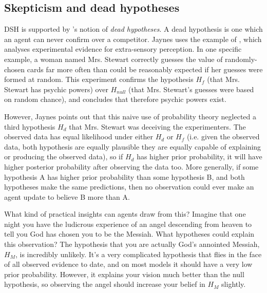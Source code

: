 \documentclass{article}
\begin{document}
\subsection{Skepticism and dead hypotheses}

DSH is supported by \citep{jaynes2003probability}'s notion of \textit{dead hypotheses}. A dead hypothesis is one which an agent can never confirm over a competitor. Jaynes uses the example of \citep{soal1954modern}, which analyses experimental evidence for extra-sensory perception. In one specific example, a woman named Mrs. Stewart correctly guesses the value of randomly-chosen cards far more often than could be reasonably expected if her guesses were formed at random. This experiment confirms the hypothesis \(H_{f}\) (that Mrs. Stewart has psychic powers) over \(H_{null}\) (that Mrs. Stewart's guesses were based on random chance), and concludes that therefore psychic powers exist. 

However, Jaynes points out that this naive use of probability theory neglected a third hypothesis \(H_{d}\) \textemdash{} that Mrs. Stewart was deceiving the experimenters. The observed data has equal likelihood under either \(H_{d}\) or \(H_{f}\) (i.e. given the observed data, both hypothesis are equally plausible \textemdash{} they are equally capable of explaining or producing the observed data), so if \(H_{d}\) has higher prior probability, it will have higher posterior probability after observing the data too. More generally, if some hypothesis A has higher prior probability than some hypothesis B, and both hypotheses make the same predictions, then no observation could ever make an agent update to believe B more than A. 

What kind of practical insights can agents draw from this? Imagine that one night you have the ludicrous experience of an angel descending from heaven to tell you God has chosen you to be the Messiah. What hypotheses could explain this observation? The hypothesis that you are actually God's annointed Messiah, \(H_{M}\), is incredibly unlikely. It's a very complicated hypothesis that flies in the face of all observed evidence to date, and on most models it should have a very low prior probability. However, it explains your vision much better than the null hypothesis, so observing the angel should increase your belief in \(H_{M}\) slightly.
\end{document}
